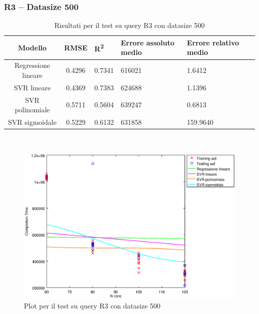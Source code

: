 \documentclass[a4paper,11pt]{article}
\begin{document}
\subsubsection{R3 -- Datasize 500}
\begin{table}[bhpt]
	\centering
	\begin{adjustbox}{center}
		\begin{tabular}{c | c M{1.2cm} M{2.5cm} M{2.5cm} M{1.8cm}}
			Modello & RMSE & R\textsuperscript{2} & Errore assoluto medio & Errore relativo medio \tabularnewline
			\hline
			Regressione lineare & 0.4296 & 0.7341 & 616021 & 1.6412 \\
			SVR lineare & 0.4369 & 0.7383 & 624688 & 1.1396 \\
			SVR polinomiale & 0.5711 & 0.5604 & 639247 & 0.6813 \\
			SVR sigmoidale & 0.5229 & 0.6132 & 631858 & 159.9640 \\
		\end{tabular}
	\end{adjustbox}
	\\
	\caption{Risultati per il test su query R3 con datasize 500}
	\label{table_R3_500}
\end{table}

\begin {figure}[hbtp]
\centering
\includegraphics[width=\textwidth]{output/R3_500/plot_R3_500.eps}
\caption {Plot per il test su query R3 con datasize 500}
\end {figure}
\newpage
\end{document}
